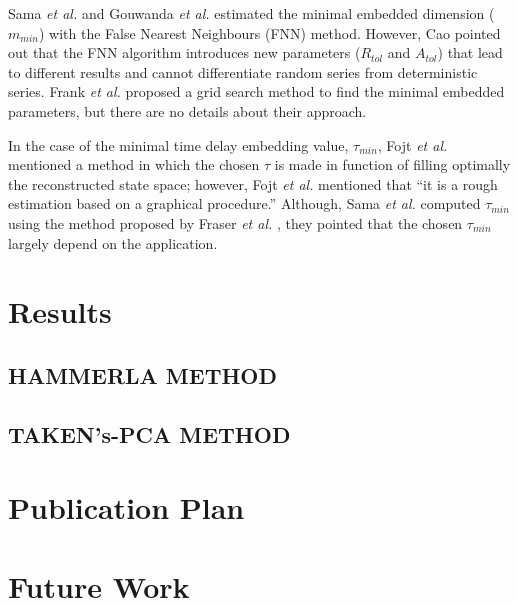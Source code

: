 \documentclass[10pt,journal,compsoc]{IEEEtran}
\begin{document}
Sama \emph{et al.} \cite{Sama2013} and Gouwanda \emph{et al.} \cite{Gouwanda2012}
estimated the minimal embedded dimension ($m_{min}$) 
with the False Nearest Neighbours (FNN) method. However, Cao \cite{Cao1997} pointed out that 
the FNN algorithm introduces new parameters ($R_{tol}$ and $A_{tol}$) that lead 
to different results and  cannot differentiate random series from deterministic series. 
Frank \emph{et al.} \cite{Frank2010} proposed a grid search method to find the minimal 
embedded parameters, but there are no details about their approach.

In the case of the minimal time delay embedding value, $\tau_{min}$,
Fojt \emph{et al.} \cite{Fojt1998} mentioned a method in which the chosen $\tau$ 
is made in function of filling optimally the reconstructed state space;
however, Fojt \emph{et al.} \cite{Fojt1998} mentioned
that ``it is a rough estimation based on a graphical procedure.''
Although, Sama \emph{et al.} \cite{Sama2013} computed $\tau_{min}$ using 
the method proposed by Fraser \emph{et al.} \cite{Fraser1986}, 
they pointed that the chosen $\tau_{min}$ largely depend on the application.


\section{Results}
\subsection{HAMMERLA METHOD}
\subsection{TAKEN's-PCA METHOD}

\section{Publication Plan}
\section{Future Work}



\end{document}
